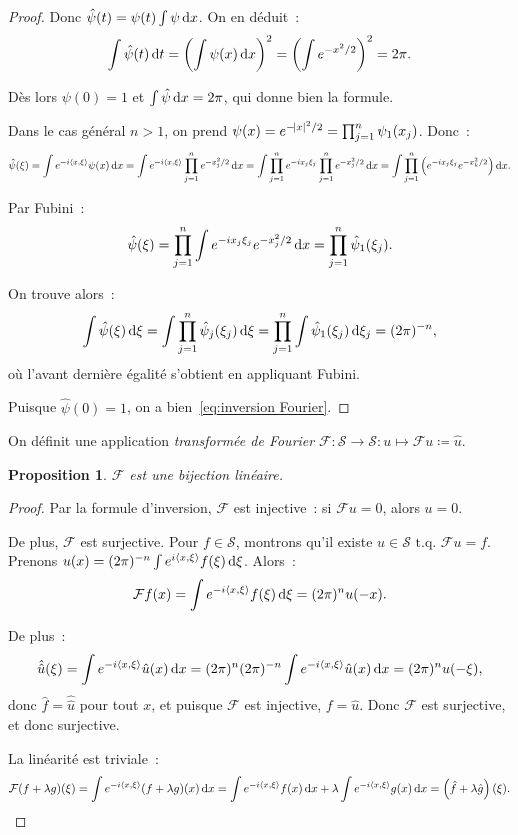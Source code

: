 \documentclass{report}
\newcommand{\scpr}[2]{\left\langle#1, #2\right\rangle}
\newcommand{\tq}{\text{ t.q. }}
\newcommand{\dx}{\dif x}
\newtheorem{prp}[thm]{Proposition}
\theoremstyle{definition}
\theoremstyle{remark}
\begin{document}
\begin{proof}
Donc $\hat \psi(t) = \psi(t)\int\psi\dx$. On en déduit~:
\[\int \hat \psi(t)\dif t = \left(\int \psi(x)\dx\right)^2 = \left(\int e^{-x^2/2}\right)^2 = 2\pi.\]

Dès lors $\psi(0) = 1$ et $\int\hat\psi\dx = 2\pi$, qui donne bien la formule.

Dans le cas général $n > 1$, on prend $\psi(x) = e^{-\abs x^2/2} = \prod_{j=1}^n\psi_1(x_j)$. Donc~:
\[\hat\psi(\xi) = \int e^{-i\scpr x\xi}\psi(x)\dx = \int e^{-i\scpr x\xi}\prod_{j=1}^ne^{-x_j^2/2}\dx = \int\prod_{j=1}^ne^{-ix_j\xi_j}\prod_{j=1}^ne^{-x_j^2/2}\dx
	= \int\prod_{j=1}^n\left(e^{-ix_j\xi_j}e^{-x_k^2/2}\right)\dx.\]

Par Fubini~:
\[\hat\psi(\xi) = \prod_{j=1}^n\int e^{-ix_j\xi_j}e^{-x_j^2/2}\dx = \prod_{j=1}^n\hat \psi_1(\xi_j).\]

On trouve alors~:
\[\int \hat \psi(\xi)\dif\xi = \int \prod_{j=1}^n\hat\psi_j(\xi_j)\dif\xi = \prod_{j=1}^n\int\hat \psi_1(\xi_j)\dif\xi_j = (2\pi)^{-n},\]
où l'avant dernière égalité s'obtient en appliquant Fubini.

Puisque $\hat \psi(0) = 1$, on a bien~\eqref{eq:inversion Fourier}.
\end{proof}

On définit une application \textit{transformée de Fourier} $\mathcal F : \mathcal S \to \mathcal S : u \mapsto \mathcal Fu \coloneqq \hat u$.

\begin{prp} $\mathcal F$ est une bijection linéaire.
\end{prp}

\begin{proof} Par la formule d'inversion, $\mathcal F$ est injective~: si $\mathcal Fu = 0$, alors $u = 0$.

De plus, $\mathcal F$ est surjective. Pour $f \in \mathcal S$, montrons qu'il existe $u \in \mathcal S \tq \mathcal Fu = f$.
Prenons $u(x) = (2\pi)^{-n}\int e^{i\scpr x\xi}f(\xi)\dif\xi$. Alors~:
\[\mathcal Ff(x) = \int e^{-i\scpr x\xi}f(\xi)\dif\xi = (2\pi)^nu(-x).\]

De plus~:
\[\hat {\hat u}(\xi) = \int e^{-i\scpr x\xi}\hat u(x)\dx = (2\pi)^n(2\pi)^{-n}\int e^{-i\scpr x\xi}\hat u(x)\dx = (2\pi)^nu(-\xi),\]
donc $\hat f = \hat {\hat u}$ pour tout $x$, et puisque $\mathcal F$ est injective, $f = \hat u$. Donc $\mathcal F$ est surjective, et donc surjective.

La linéarité est triviale~:
\[\mathcal F(f+\lambda g)(\xi) = \int e^{-i\scpr x\xi}(f+\lambda g)(x)\dx = \int e^{-i\scpr x\xi}f(x)\dx + \lambda\int e^{-i\scpr x\xi}g(x)\dx
	= \left(\hat f + \lambda \hat g\right)(\xi).\]
\end{proof}
\end{document}
